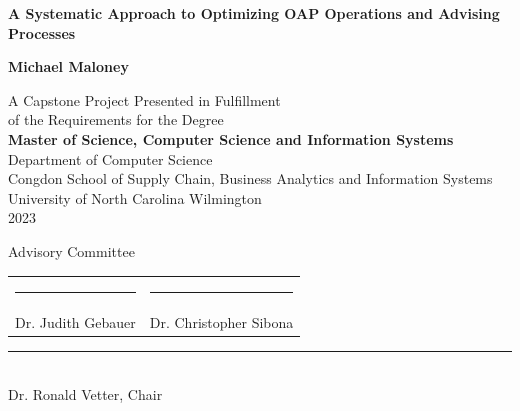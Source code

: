 \documentclass[12pt]{article}
\begin{document}
\begin{titlepage}
  \begin{center}
      \vspace{1cm}
      \textbf{\LARGE A Systematic Approach to Optimizing OAP Operations and Advising Processes}

      \vspace{0.5cm}

      \vspace{0.5cm}
      \textbf{\large Michael Maloney}

      \vspace{0.5cm}
      A Capstone Project Presented in Fulfillment\\
      of the Requirements for the Degree\\
      \textbf{\large Master of Science, Computer Science and Information Systems}\\

      \vspace{1cm}
      Department of Computer Science\\
      Congdon School of Supply Chain, Business Analytics and Information Systems\\
      University of North Carolina Wilmington\\
      2023\\
      \vspace{1cm}

      Advisory Committee\\
      \vspace{1cm}
      \begin{tabular}{ c c }
        \rule{2.5in}{0.5pt} & \rule{2.5in}{0.5pt} \\
        Dr. Judith Gebauer & Dr. Christopher Sibona \\      
      \end{tabular}

      \vspace{1.5cm}
      \rule{2.5in}{0.5pt} \\
      Dr. Ronald Vetter, Chair \\
  \end{center}
\end{titlepage}
\end{document}
